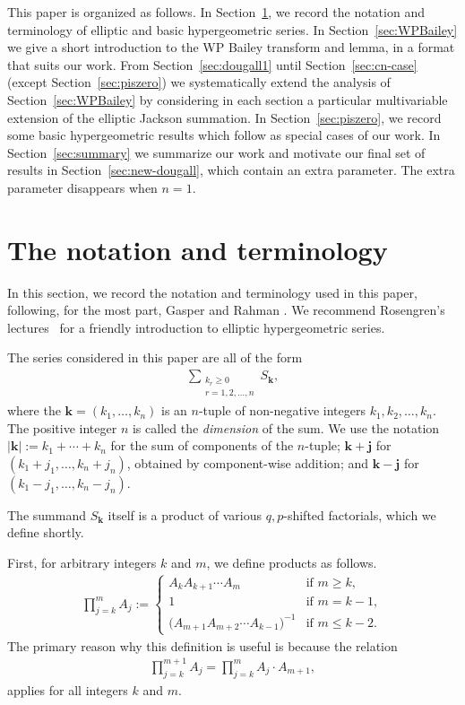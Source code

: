\documentclass[pdftex]{sigma}
\numberwithin{equation}{section}
\newcommand{\sumvec}[2]{#1_1+\cdots + #1_#2} %
\newcommand\sumk{{\left| \boldsymbol{k} \right|}}
\renewcommand{\k}{{ \boldsymbol{k}}}
\renewcommand{\j}{{ \boldsymbol{j}}}
\newcommand{\kvec}{{k_1, \dots,k_n}}
\begin{document}
This paper is organized as follows. In Section~\ref{sec:notation}, we record the notation and terminology of elliptic and basic hypergeometric series. In Section~\ref{sec:WPBailey} we give a short introduction to the WP Bailey transform and lemma, in a format that suits our work.
From Section~\ref{sec:dougall1} until Section~\ref{sec:cn-case} (except Section~\ref{sec:piszero}) we systematically extend the analysis of
Section~\ref{sec:WPBailey} by considering in each section a particular multivariable extension of the elliptic Jackson summation. In Section~\ref{sec:piszero}, we record some basic hypergeometric results which follow as special cases of our work. In Section~\ref{sec:summary} we summarize our work and motivate our final set of results in Section~\ref{sec:new-dougall}, which contain an extra parameter. The extra parameter disappears when $n=1$.

\section{The notation and terminology}\label{sec:notation}
In this section, we record the notation and terminology used in this paper, following, for the most part, Gasper and Rahman \cite{GR90}. We recommend Rosengren's lectures~\cite{HR2016-lectures} for a friendly introduction to elliptic hypergeometric series.

The series considered in this paper are all of the form
\begin{gather*}
\sum\limits_{\substack{{k_r\geq 0 } \\ {r =1,2,\dots, n}}} S_\k,
\end{gather*}
where the $\k=(\kvec )$ is an $n$-tuple of non-negative integers $k_1, k_2, \dots, k_n$. The positive integer $n$ is called the {\em dimension} of the sum. We use the notation $\sumk:= \sumvec{k}{n}$ for the sum of components of the $n$-tuple; $\k+\j$ for $(k_1+j_1, \dots, k_n+j_n)$, obtained by component-wise addition; and $\k-\j$ for $(k_1-j_1, \dots, k_n-j_n)$.

The summand $S_\k$ itself is a product of various $q, p$-shifted factorials, which we define shortly.

First, for arbitrary integers $k$ and $m$, we define products as follows.
\begin{gather}\label{proddef}
\prod_{j=k}^m A_j := \begin{cases}
A_kA_{k+1}\cdots A_m & \text{if } m\geq k,\\
1 & \text{if } m= k-1,\\
\big(A_{m+1}A_{m+2}\cdots A_{k-1}\big)^{-1} &\text{if } m\leq k-2.
\end{cases}
\end{gather}
The primary reason why this definition is useful is because the relation
\begin{gather*}%
\prod_{j=k}^{m+1} A_j = \prod_{j=k}^m A_j \cdot A_{m+1},
\end{gather*}
applies for all integers $k$ and $m$.
\end{document}

